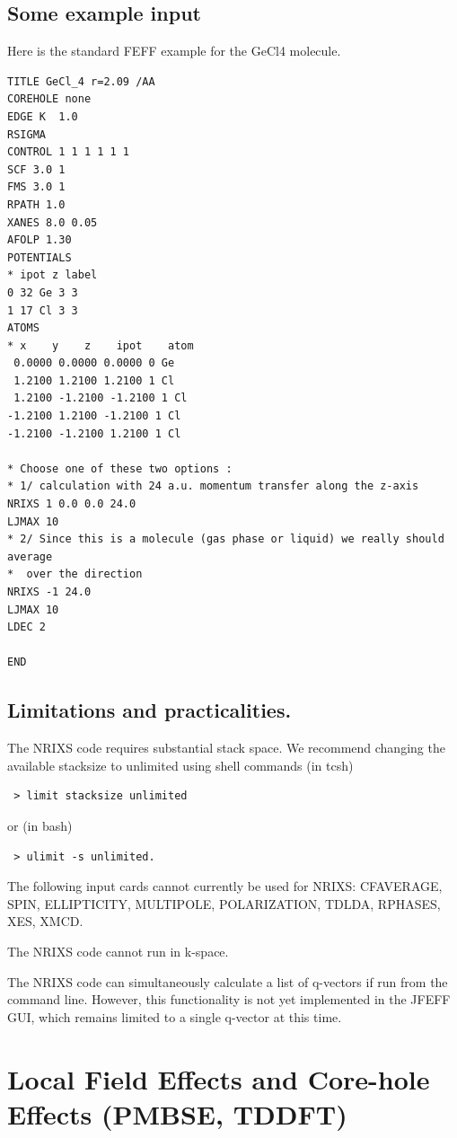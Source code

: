 \documentclass[11pt,oneside]{report} %
\begin{document}
\subsection{Some example input}
Here is the standard FEFF example for the GeCl4 molecule.
\begin{verbatim}
TITLE GeCl_4 r=2.09 /AA
COREHOLE none
EDGE K  1.0
RSIGMA
CONTROL 1 1 1 1 1 1
SCF 3.0 1
FMS 3.0 1
RPATH 1.0
XANES 8.0 0.05
AFOLP 1.30
POTENTIALS
* ipot z label
0 32 Ge 3 3
1 17 Cl 3 3
ATOMS
* x    y    z    ipot    atom
 0.0000 0.0000 0.0000 0 Ge
 1.2100 1.2100 1.2100 1 Cl 
 1.2100 -1.2100 -1.2100 1 Cl
-1.2100 1.2100 -1.2100 1 Cl
-1.2100 -1.2100 1.2100 1 Cl

* Choose one of these two options :
* 1/ calculation with 24 a.u. momentum transfer along the z-axis
NRIXS 1 0.0 0.0 24.0
LJMAX 10
* 2/ Since this is a molecule (gas phase or liquid) we really should average 
*  over the direction
NRIXS -1 24.0
LJMAX 10
LDEC 2

END
\end{verbatim}

\subsection{Limitations and practicalities.}
The NRIXS code requires substantial stack space.  We recommend changing the available stacksize to unlimited using shell commands  (in tcsh)
\begin{verbatim} > limit stacksize unlimited \end{verbatim}
or (in bash)
\begin{verbatim} > ulimit -s unlimited.\end{verbatim}

The following input cards cannot currently be used for NRIXS:
  CFAVERAGE, SPIN, ELLIPTICITY, MULTIPOLE, POLARIZATION, TDLDA, RPHASES, XES, XMCD.

The NRIXS code cannot run in k-space.

The NRIXS code can simultaneously calculate a list of q-vectors if run from the command line.  However, this functionality is not yet implemented in the JFEFF GUI,
which remains limited to a single q-vector at this time.


\section{Local Field Effects and Core-hole Effects (PMBSE, TDDFT)}
\label{sec:Loc-field-core-hole}
\end{document}
